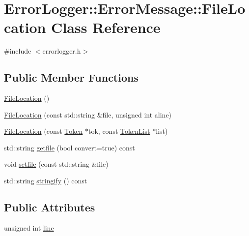 \hypertarget{class_error_logger_1_1_error_message_1_1_file_location}{\section{Error\-Logger\-:\-:Error\-Message\-:\-:File\-Location Class Reference}
\label{class_error_logger_1_1_error_message_1_1_file_location}
}


{\ttfamily \#include $<$errorlogger.\-h$>$}

\subsection*{Public Member Functions}
\begin{DoxyCompactItemize}
\item 
\hyperlink{class_error_logger_1_1_error_message_1_1_file_location_a7651ee046c9b929591f84e082d8520a8}{File\-Location} ()
\item 
\hyperlink{class_error_logger_1_1_error_message_1_1_file_location_adabbdd63c2433376b8ba7e3c5a21785d}{File\-Location} (const std\-::string \&file, unsigned int aline)
\item 
\hyperlink{class_error_logger_1_1_error_message_1_1_file_location_a591ac864f84bb686db4de7761a7eb742}{File\-Location} (const \hyperlink{class_token}{Token} $\ast$tok, const \hyperlink{class_token_list}{Token\-List} $\ast$list)
\item 
std\-::string \hyperlink{class_error_logger_1_1_error_message_1_1_file_location_aaf3be759614b48dafa721c9bf4ae48a9}{getfile} (bool convert=true) const 
\item 
void \hyperlink{class_error_logger_1_1_error_message_1_1_file_location_a9ea74e493f787de10f42c3918bc40057}{setfile} (const std\-::string \&file)
\item 
std\-::string \hyperlink{class_error_logger_1_1_error_message_1_1_file_location_aa4c92410f1fd68332dc08ccce884ee34}{stringify} () const 
\end{DoxyCompactItemize}
\subsection*{Public Attributes}
\begin{DoxyCompactItemize}
\item 
unsigned int \hyperlink{class_error_logger_1_1_error_message_1_1_file_location_a5cd095659330d178a04f217d410f4a53}{line}
\end{DoxyCompactItemize}


